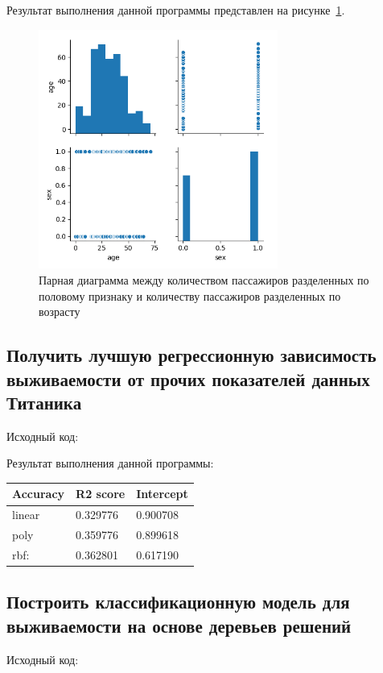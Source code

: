 Результат выполнения данной программы представлен на рисунке~\ref{fig:main_2}.

\begin{figure}[H]
    \centering
        \includegraphics[width=0.7\textwidth]{main_2}
    \caption{Парная диаграмма между количеством пассажиров разделенных по половому признаку и количеству пассажиров разделенных по возрасту}
    \label{fig:main_2}
\end{figure}

\subsection*{Получить лучшую регрессионную зависимость выживаемости от прочих показателей данных Титаника}
Исходный код:  
 

Результат выполнения данной программы:

\begin{table}[H]
  \begin{tabular}{l|l|l}
    \textbf{Accuracy} & \textbf{R2 score} & \textbf{Intercept} \\\hline
	linear & 0.329776 & 0.900708 \\
	poly & 0.359776 & 0.899618 \\
	rbf: & 0.362801 & 0.617190 \\
  \end{tabular}
  \label{tab:main_3_results}
\end{table}

\subsection*{Построить классификационную модель для выживаемости на основе деревьев решений}
Исходный код:  
 

